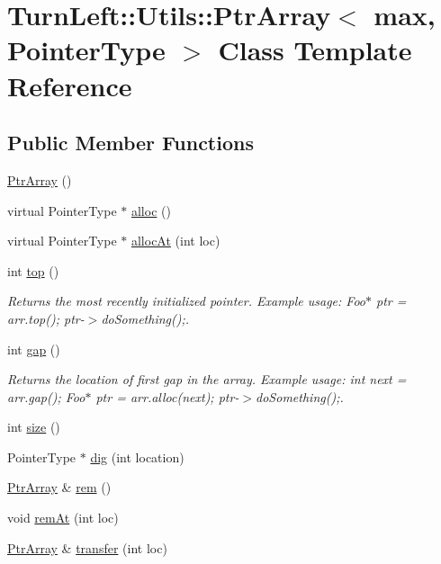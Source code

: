 \hypertarget{classTurnLeft_1_1Utils_1_1PtrArray}{
\section{TurnLeft::Utils::PtrArray$<$ max, PointerType $>$ Class Template Reference}
\label{classTurnLeft_1_1Utils_1_1PtrArray}
}
\subsection*{Public Member Functions}
\begin{DoxyCompactItemize}
\item 
\hyperlink{classTurnLeft_1_1Utils_1_1PtrArray_a8670412ddd365845f034ec999e87efe7}{PtrArray} ()
\item 
virtual PointerType $\ast$ \hyperlink{classTurnLeft_1_1Utils_1_1PtrArray_aef344fc6ecf86d29b6c6ab7947d16bfb}{alloc} ()
\item 
virtual PointerType $\ast$ \hyperlink{classTurnLeft_1_1Utils_1_1PtrArray_aaa6a0e04edfdf8c7c9d431b1a3e9c92f}{allocAt} (int loc)
\item 
int \hyperlink{classTurnLeft_1_1Utils_1_1PtrArray_a6f86a6ff7f98703201eac37497c5fd16}{top} ()
\begin{DoxyCompactList}\small\item\em Returns the most recently initialized pointer. Example usage: Foo$\ast$ ptr = arr.top(); ptr-\/$>$doSomething();. \item\end{DoxyCompactList}\item 
int \hyperlink{classTurnLeft_1_1Utils_1_1PtrArray_a97afb5c3ce5b22060337e41e5d2c49cd}{gap} ()
\begin{DoxyCompactList}\small\item\em Returns the location of first gap in the array. Example usage: int next = arr.gap(); Foo$\ast$ ptr = arr.alloc(next); ptr-\/$>$doSomething();. \item\end{DoxyCompactList}\item 
int \hyperlink{classTurnLeft_1_1Utils_1_1PtrArray_a540d3765bfc55fd34793625b56149583}{size} ()
\item 
PointerType $\ast$ \hyperlink{classTurnLeft_1_1Utils_1_1PtrArray_a415bf117c63ead5703beeb0e73f1e65b}{dig} (int location)
\item 
\hyperlink{classTurnLeft_1_1Utils_1_1PtrArray}{PtrArray} \& \hyperlink{classTurnLeft_1_1Utils_1_1PtrArray_a8664b0d9a6bd1588452961c874af92d8}{rem} ()
\item 
void \hyperlink{classTurnLeft_1_1Utils_1_1PtrArray_aac5d7c50179cdfd02bd47b89a3bc4e26}{remAt} (int loc)
\item 
\hyperlink{classTurnLeft_1_1Utils_1_1PtrArray}{PtrArray} \& \hyperlink{classTurnLeft_1_1Utils_1_1PtrArray_a18c6f0b203495ec27f17253d730cdcac}{transfer} (int loc)
\end{DoxyCompactItemize}
